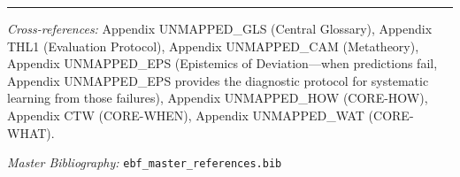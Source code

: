 
\vspace{1em}
\hrule
\vspace{0.5em}

\noindent\textit{Cross-references:}
Appendix UNMAPPED_GLS (Central Glossary),
Appendix THL1 (Evaluation Protocol),
Appendix UNMAPPED_CAM (Metatheory),
Appendix UNMAPPED_EPS (Epistemics of Deviation---when predictions fail, Appendix UNMAPPED_EPS provides the diagnostic protocol for systematic learning from those failures),
Appendix UNMAPPED_HOW (CORE-HOW),
Appendix CTW (CORE-WHEN),
Appendix UNMAPPED_WAT (CORE-WHAT).

\noindent\textit{Master Bibliography:} \texttt{ebf\_master\_references.bib}

